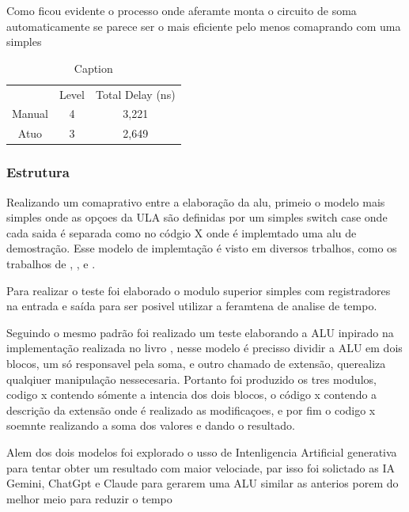Como ficou evidente o processo onde  aferamte monta o circuito de soma automaticamente se parece ser  o mais eficiente pelo menos comaprando com uma simples 

\begin{table}[!htb]
\caption{Comparativo de timign entre o metodo de soma\label{tab:ComTming}}
    \centering
    \begin{tabular}{ccc}
         & Level & Total Delay (ns) \\
        Manual & 4 & 3,221 \\
        Atuo & 3 & 2,649 \\
    \end{tabular}
    \caption{Caption}
    \label{tab:my_label}
\end{table}



\subsubsection{Estrutura}
\label{subSub:estrutura}

Realizando um comaprativo entre a elaboração da alu, primeio o modelo mais simples onde as opçoes da ULA são definidas por um simples switch case onde cada saida é separada como no códgio X onde é implemtado uma alu de demostração. Esse modelo de implemtação é visto em diversos trbalhos, como os trabalhos de , ,  e
.

Para realizar o teste foi elaborado o modulo  superior simples com registradores na entrada e saída para ser posivel utilizar a feramtena de analise de tempo.


Seguindo o mesmo padrão foi realizado um teste elaborando a ALU inpirado na implementação realizada no livro , nesse modelo é precisso dividir a ALU em dois blocos, um só responsavel pela soma, e outro chamado de extensão, querealiza qualqiuer manipulação nessecesaria. Portanto foi produzido os tres modulos, codigo x contendo sómente a intencia dos dois blocos, o código x contendo a descrição da extensão onde é realizado as modificaçoes, e por fim o codigo x soemnte realizando a soma dos valores e dando o resultado.





Alem dos dois modelos foi explorado o usso de Intenligencia Artificial generativa para tentar obter um resultado com maior velociade, par isso foi solictado as IA Gemini, ChatGpt e Claude para gerarem uma ALU similar as anterios porem do melhor meio para reduzir o tempo



